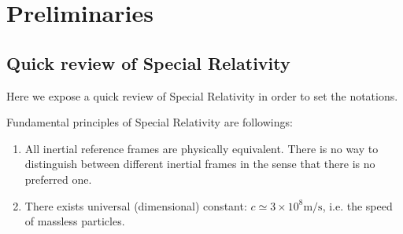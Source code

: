 \documentclass[../main/main.tex]{subfiles}
\begin{document}
\chapter{Preliminaries}
\section{Quick review of Special Relativity}

Here we expose a quick review of Special Relativity in order to set the notations.

\skipline
Fundamental principles of Special Relativity are followings:
\begin{enumerate}
\item All inertial reference frames are physically equivalent. There is no way to distinguish between different inertial frames in the sense that there is no preferred one. 
\item There exists universal (dimensional) constant: $c\simeq3\times10^8\text{m/s}$, i.e. the speed of massless particles.
\end{enumerate}
\end{document}
